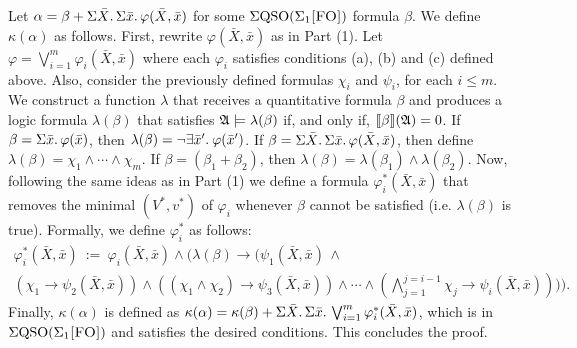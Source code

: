  Let $\alpha = \beta + \Sigma{\bar{X}}.\,\Sigma{\bar{x}}.\, \varphi(\bar{X},\bar{x})$ for some $\Sigma{\rm QSO}(\Sigma_{1}\textsc{[FO]})$ formula $\beta$. We define $\kappa(\alpha)$ as follows.
First, rewrite $\varphi(\bar{X},\bar{x})$ as in Part (1). Let $\varphi = \bigvee_{i = 1}^m\varphi_i(\bar{X},\bar{x})$ where each $\varphi_i$ satisfies conditions (a), (b) and (c) defined above. Also, consider the previously defined formulas $\chi_i$ and $\psi_i$, for each $i \leq m$. 
We construct a function $\lambda$ that receives a quantitative formula $\beta$ and produces a logic formula $\lambda(\beta)$ that satisfies $\mathfrak{A}\models\lambda(\beta)$ if, and only if, ${\llbracket{}{\beta}\rrbracket}(\mathfrak{A}) = 0$. If $\beta = \Sigma{\bar{x}}.\, \varphi(\bar{x})$, then $\lambda(\beta) = \neg \exists{\bar{x}'}.\: \varphi(\bar{x}')$. If $\beta = \Sigma{\bar{X}}.\,\Sigma{\bar{x}}.\,\varphi(\bar{X},\bar{x})$, then 
define $\lambda(\beta) = \chi_1\wedge \cdots\wedge\chi_m$. If $\beta = (\beta_1 + \beta_2)$, then $\lambda(\beta) = \lambda(\beta_1) \wedge \lambda(\beta_2)$.
Now, following the same ideas as in Part (1) we define a formula $\varphi_i^*(\bar{X},\bar{x})$ that removes the minimal $(V^*, v^*)$ of $\varphi_i$ whenever $\beta$ cannot be satisfied (i.e. $\lambda(\beta)$ is true). Formally, we define $\varphi_i^*$ as follows:
\begin{multline*}
\varphi_i^*(\bar{X},\bar{x}) \ := \ \varphi_i(\bar{X},\bar{x})\wedge\Big(\lambda(\beta)\to\Big(\psi_1(\bar{X},\bar{x})\,\wedge \\
(\chi_1\to\psi_2(\bar{X},\bar{x}))\wedge((\chi_1\wedge\chi_2)\to\psi_3(\bar{X},\bar{x}))\wedge\cdots\wedge(
\bigwedge_{j = 1}^{j = i-1}\chi_j\to\psi_i(\bar{X},\bar{x}))\Big)\Big).
\end{multline*}
Finally, $\kappa(\alpha)$ is defined as $\kappa(\alpha) = \kappa(\beta) + \Sigma{\bar{X}}.\,\Sigma{\bar{x}}.\, \bigvee_{i = 1}^m\varphi_i^*(\bar{X},\bar{x})$, which is in $\Sigma{\rm QSO}(\Sigma_{1}\textsc{[FO]})$ and satisfies the desired conditions. This concludes the proof.